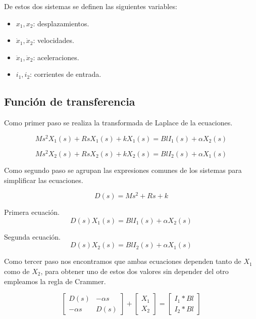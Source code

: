 \documentclass[journal]{IEEEtran}
\begin{document}
De estos dos sistemas se definen las siguientes variables:

\begin{itemize}
\item $x_1, x_2$: desplazamientos.
\item $\dot{x}_1, \dot{x}_2$: velocidades.
\item $\ddot{x}_1, \ddot{x}_2$: aceleraciones.
\item $i_1, i_2$: corrientes de entrada.
\end{itemize}

\subsection{Función de transferencia}
Como primer paso se realiza la transformada de Laplace de la ecuaciones.

\begin{equation*}
    Ms^2X_1(s) + RsX_1(s) + kX_1(s) = Bl I_1(s) + \alpha {X}_2(s)  
\end{equation*}


\begin{equation*}
   Ms^2{X}_2(s) + Rs{X}_2(s) + kX_2(s) = Bl I_2(s) + \alpha {X}_1(s)
\end{equation*}


Como segundo paso se agrupan las expresiones comunes de los sistemas para simplificar las ecuaciones.


\begin{equation*}
    D(s)= Ms^2 + Rs + k    
\end{equation*}

Primera ecuación.
\begin{equation*}
    D(s){X}_1(s)= Bl I_1(s) + \alpha {X}_2(s)
\end{equation*}

Segunda ecuación.
\begin{equation*}
    D(s)X_2(s) = Bl I_2(s) + \alpha {X}_1(s)
\end{equation*}

Como tercer paso nos encontramos que ambas ecuaciones dependen tanto de $X_1$ como de $X_2$, para obtener uno de estos dos valores sin depender del otro empleamos la regla de Crammer.

\begin{equation*}
\begin{bmatrix} D(s) & -{\alpha}s \\ -{\alpha}s & D(s) \end{bmatrix} + 
\begin{bmatrix} X_1  \\ X_2  \end{bmatrix} = 
\begin{bmatrix} I_1*Bl \\ I_2*Bl \end{bmatrix}
\end{equation*}
\end{document}
